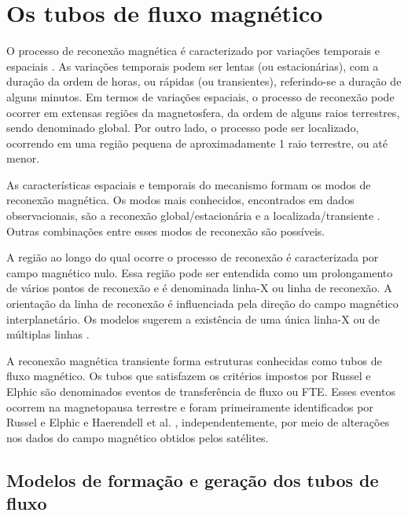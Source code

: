 \section{Os tubos de fluxo magnético}
\label{FTE}

O processo de reconexão magnética é caracterizado por variações temporais e espaciais \cite{gonzalez1974,elphic1978}. As variações temporais podem ser lentas (ou estacionárias), com a duração da ordem de horas, ou rápidas (ou transientes), referindo-se a duração de alguns minutos. Em termos de variações espaciais, o processo de reconexão pode ocorrer em extensas regiões da magnetosfera, da ordem de alguns raios terrestres, sendo denominado global. Por outro lado, o processo pode ser localizado, ocorrendo em uma região pequena de aproximadamente 1 raio terrestre, ou até menor.   

As características espaciais e temporais do mecanismo formam os modos de reconexão magnética. Os modos mais conhecidos, encontrados em dados observacionais, são a reconexão global/estacionária \cite{gonzalez1974} e a localizada/transiente \cite{elphic1978}. Outras combinações entre esses modos de reconexão são possíveis.

A região ao longo do qual ocorre o processo de reconexão é caracterizada por campo magnético nulo. Essa região pode ser entendida como um prolongamento de vários pontos de reconexão e é denominada linha-X ou linha de reconexão\cite{gonzalez1974}. A orientação da linha de reconexão é influenciada pela direção do campo magnético interplanetário. Os modelos sugerem a existência de uma única linha-X \cite{southwood1988,scholer1988} ou de múltiplas linhas \cite{lee1985}.

A reconexão magnética transiente forma estruturas conhecidas como tubos de fluxo magnético. Os tubos que satisfazem os critérios impostos por Russel e Elphic \cite{elphic1978} são denominados eventos de transferência de fluxo ou FTE. Esses eventos ocorrem na magnetopausa terrestre e foram primeiramente identificados por Russel e Elphic \cite{elphic1978} e Haerendell et al. \cite{haerendel1978}, independentemente, por meio de alterações nos dados do campo magnético obtidos pelos satélites.


\subsection{Modelos de formação e geração dos tubos de fluxo}
\label{modeloRussel}

